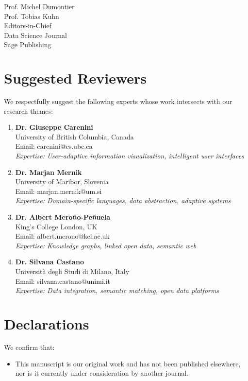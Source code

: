 \documentclass[11pt,a4paper]{letter}
\begin{document}
\begin{letter}{%
Prof. Michel Dumontier\\
Prof. Tobias Kuhn\\
Editors-in-Chief\\
Data Science Journal\\
Sage Publishing
}
\section*{Suggested Reviewers}

We respectfully suggest the following experts whose work intersects with our research themes:

\begin{enumerate}
    \item \textbf{Dr. Giuseppe Carenini}\\
    University of British Columbia, Canada\\
    Email: carenini@cs.ubc.ca\\
    \textit{Expertise: User-adaptive information visualization, intelligent user interfaces}

    \item \textbf{Dr. Marjan Mernik}\\
    University of Maribor, Slovenia\\
    Email: marjan.mernik@um.si\\
    \textit{Expertise: Domain-specific languages, data abstraction, adaptive systems}

    \item \textbf{Dr. Albert Meroño-Peñuela}\\
    King's College London, UK\\
    Email: albert.merono@kcl.ac.uk\\
    \textit{Expertise: Knowledge graphs, linked open data, semantic web}

    \item \textbf{Dr. Silvana Castano}\\
    Università degli Studi di Milano, Italy\\
    Email: silvana.castano@unimi.it\\
    \textit{Expertise: Data integration, semantic matching, open data platforms}
\end{enumerate}

\section*{Declarations}

We confirm that:

\begin{itemize}
    \item This manuscript is our original work and has not been published elsewhere, nor is it currently under consideration by another journal.


\end{itemize}
\end{letter}
\end{document}

